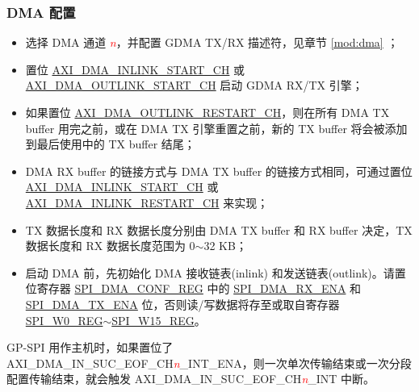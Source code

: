 \documentclass[main\_\_CN.tex]{subfiles}
\begin{document}
\subsubsection{DMA 配置}\label{sec:DMA-conf}


\begin{itemize}
    \item 选择 DMA 通道 \textcolor{red}{\it{n}}，并配置 GDMA TX/RX 描述符，见章节 \ref{mod:dma} \textit{}；
    
    \item 置位 \hyperref[fielddesc:AXIDMAINLINKSTARTCHN]{AXI\_DMA\_INLINK\_START\_CH} 或 \hyperref[fielddesc:AXIDMAOUTLINKSTARTCHN]{AXI\_DMA\_OUTLINK\_START\_CH}  启动 GDMA RX/TX 引擎； 

    \item 如果置位 \hyperref[fielddesc:AXIDMAOUTLINKRESTARTCHN]{AXI\_DMA\_OUTLINK\_RESTART\_CH}，则在所有 DMA TX buffer 用完之前，或在 DMA TX 引擎重置之前，新的 TX buffer 将会被添加到最后使用中的 TX buffer 结尾；
  
    \item DMA RX buffer 的链接方式与 DMA TX buffer 的链接方式相同，可通过置位 \hyperref[fielddesc:AXIDMAINLINKSTARTCHN]{AXI\_DMA\_INLINK\_START\_CH}  或 \hyperref[fielddesc:AXIDMAINLINKRESTARTCHN]{AXI\_DMA\_INLINK\_RESTART\_CH} 来实现；
  
    \item TX 数据长度和 RX 数据长度分别由 DMA TX buffer 和 RX buffer 决定，TX 数据长度和 RX 数据长度范围为 0$\sim$32 KB； 
  
    \item 启动 DMA 前，先初始化 DMA 接收链表(inlink) 和发送链表(outlink)。请置位寄存器 \hyperref[regdesc:SPIDMACONFREG]{SPI\_DMA\_CONF\_REG} 中的 \hyperref[fielddesc:SPIDMARXENA]{SPI\_DMA\_RX\_ENA} 和 \hyperref[fielddesc:SPIDMATXENA]{SPI\_DMA\_TX\_ENA} 位，否则读/写数据将存至或取自寄存器 \hyperref[regdesc:SPIW0REG]{SPI\_W0\_REG}$\sim$\hyperref[regdesc:SPIW15REG]{SPI\_W15\_REG}。
  
\end{itemize}

GP-SPI 用作主机时，如果置位了 AXI\_DMA\_IN\_SUC\_EOF\_CH\textcolor{red}{\it{n}}\_INT\_ENA，则一次单次传输结束或一次分段配置传输结束，就会触发 AXI\_DMA\_IN\_SUC\_EOF\_CH\textcolor{red}{\it{n}}\_INT 中断。
\end{document}
